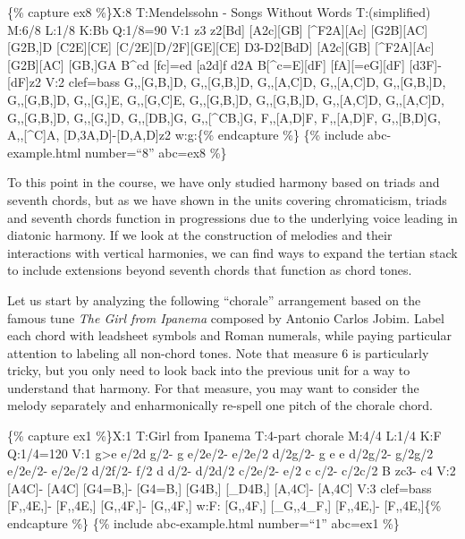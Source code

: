 \documentclass{book}
\begin{document}
\{\% capture ex8 \%\}X:8 T:Mendelssohn - Songs Without Words T:(simplified)
M:6/8 L:1/8 K:Bb Q:1/8=90 V:1 z3 z2{[}Bd{]}\textbar{} {[}A2c{]}{[}GB{]}
{[}\^{}F2A{]}{[}Ac{]}\textbar{} {[}G2B{]}{[}AC{]} {[}G2B,{]}D\textbar{}
{[}C2E{]}{[}CE{]} {[}C/2E{]}{[}D/2F{]}{[}GE{]}{[}CE{]}\textbar{}
D3-D2{[}BdD{]}\textbar{} {[}A2c{]}{[}GB{]} {[}\^{}F2A{]}{[}Ac{]}\textbar{}
{[}G2B{]}{[}AC{]} {[}GB,{]}GA\textbar{} B\^{}cd {[}fc{]}=ed\textbar{}
{[}a2d{]}f d2A\textbar{} B{[}\^{}c=E{]}{[}dF{]}
{[}fA{]}{[}=eG{]}{[}dF{]}\textbar{} {[}d3F{]}-{[}dF{]}z2\textbar{]} V:2
clef=bass G,,{[}G,B,{]}D, G,,{[}G,B,{]}D,\textbar{} G,,{[}A,C{]}D,
G,,{[}A,C{]}D,\textbar{} G,,{[}G,B,{]}D, G,,{[}G,B,{]}D,\textbar{}
G,,{[}G,{]}E, G,,{[}G,C{]}E,\textbar{} G,,{[}G,B,{]}D,
G,,{[}G,B,{]}D,\textbar{} G,,{[}A,C{]}D, G,,{[}A,C{]}D,\textbar{}
G,,{[}G,B,{]}D, G,,{[}G,{]}D,\textbar{} G,,{[}DB,{]}G,
G,,{[}\^{}CB,{]}G,\textbar{} F,,{[}A,D{]}F, F,,{[}A,D{]}F,\textbar{}
G,,{[}B,D{]}G, A,,{[}\^{}C{]}A,\textbar{}
{[}D,3A,D{]}-{[}D,A,D{]}z2\textbar{]} w:g:\{\% endcapture \%\} \{\% include
abc-example.html number=``8'' abc=ex8 \%\}

To this point in the course, we have only studied harmony based on triads and
seventh chords, but as we have shown in the units covering chromaticism,
triads and seventh chords function in progressions due to the underlying voice
leading in diatonic harmony. If we look at the construction of melodies and
their interactions with vertical harmonies, we can find ways to expand the
tertian stack to include extensions beyond seventh chords that function as
chord tones.

Let us start by analyzing the following ``chorale'' arrangement based on the
famous tune \emph{The Girl from Ipanema} composed by Antonio Carlos Jobim.
Label each chord with leadsheet symbols and Roman numerals, while paying
particular attention to labeling all non-chord tones. Note that measure 6 is
particularly tricky, but you only need to look back into the previous unit for
a way to understand that harmony. For that measure, you may want to consider
the melody separately and enharmonically re-spell one pitch of the chorale
chord.

\{\% capture ex1 \%\}X:1 T:Girl from Ipanema T:4-part chorale M:4/4 L:1/4 K:F
Q:1/4=120 V:1 g\textgreater e e/2d g/2-\textbar{} g e/2e/2- e/2e/2
d/2g/2-\textbar{} g e e d/2g/2-\textbar{} g/2g/2 e/2e/2- e/2e/2
d/2f/2-\textbar{} f/2 d d/2- d/2d/2 c/2e/2-\textbar{} e/2 c c/2- c/2c/2
B\textbar{} zc3-\textbar{} c4\textbar{]} V:2 {[}A4C{]}-\textbar{}
{[}A4C{]}\textbar{} {[}G4=B,{]}-\textbar{} {[}G4=B,{]}\textbar{}
{[}G4B,{]}\textbar{} {[}\_D4B,{]}\textbar{} {[}A,4C{]}-\textbar{}
{[}A,4C{]}\textbar{]} V:3 clef=bass {[}F,,4E,{]}-\textbar{}
{[}F,,4E,{]}\textbar{} {[}G,,4F,{]}-\textbar{} {[}G,,4F,{]}\textbar{} w:F:
{[}G,,4F,{]}\textbar{} {[}\_G,,4\_F,{]}\textbar{} {[}F,,4E,{]}-\textbar{}
{[}F,,4E,{]}\textbar{]}\{\% endcapture \%\} \{\% include abc-example.html
number=``1'' abc=ex1 \%\}
\end{document}
